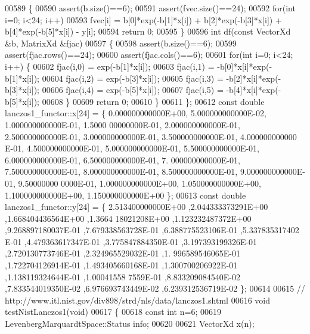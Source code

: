 \begin{DoxyCode}
00589     \{
00590         assert(b.size()==6);
00591         assert(fvec.size()==24);
00592         \textcolor{keywordflow}{for}(\textcolor{keywordtype}{int} i=0; i<24; i++)
00593             fvec[i] = b[0]*exp(-b[1]*x[i]) + b[2]*exp(-b[3]*x[i]) + b[4]*exp(-b[5]*x[i])  - y[i];
00594         \textcolor{keywordflow}{return} 0;
00595     \}
00596     \textcolor{keywordtype}{int} df(\textcolor{keyword}{const} VectorXd &b, MatrixXd &fjac)
00597     \{
00598         assert(b.size()==6);
00599         assert(fjac.rows()==24);
00600         assert(fjac.cols()==6);
00601         \textcolor{keywordflow}{for}(\textcolor{keywordtype}{int} i=0; i<24; i++) \{
00602             fjac(i,0) = exp(-b[1]*x[i]);
00603             fjac(i,1) = -b[0]*x[i]*exp(-b[1]*x[i]);
00604             fjac(i,2) = exp(-b[3]*x[i]);
00605             fjac(i,3) = -b[2]*x[i]*exp(-b[3]*x[i]);
00606             fjac(i,4) = exp(-b[5]*x[i]);
00607             fjac(i,5) = -b[4]*x[i]*exp(-b[5]*x[i]);
00608         \}
00609         \textcolor{keywordflow}{return} 0;
00610     \}
00611 \};
00612 \textcolor{keyword}{const} \textcolor{keywordtype}{double} lanczos1\_functor::x[24] = \{ 0.000000000000E+00, 5.000000000000E-02, 1.000000000000E-01, 1.5000
      00000000E-01, 2.000000000000E-01, 2.500000000000E-01, 3.000000000000E-01, 3.500000000000E-01, 4.000000000000
      E-01, 4.500000000000E-01, 5.000000000000E-01, 5.500000000000E-01, 6.000000000000E-01, 6.500000000000E-01, 7.
      000000000000E-01, 7.500000000000E-01, 8.000000000000E-01, 8.500000000000E-01, 9.000000000000E-01, 9.50000000
      0000E-01, 1.000000000000E+00, 1.050000000000E+00, 1.100000000000E+00, 1.150000000000E+00 \};
00613 \textcolor{keyword}{const} \textcolor{keywordtype}{double} lanczos1\_functor::y[24] = \{ 2.513400000000E+00 ,2.044333373291E+00 ,1.668404436564E+00 ,1.3664
      18021208E+00 ,1.123232487372E+00 ,9.268897180037E-01 ,7.679338563728E-01 ,6.388775523106E-01 ,5.337835317402
      E-01 ,4.479363617347E-01 ,3.775847884350E-01 ,3.197393199326E-01 ,2.720130773746E-01 ,2.324965529032E-01 ,1.
      996589546065E-01 ,1.722704126914E-01 ,1.493405660168E-01 ,1.300700206922E-01 ,1.138119324644E-01 ,1.00041558
      7559E-01 ,8.833209084540E-02 ,7.833544019350E-02 ,6.976693743449E-02 ,6.239312536719E-02 \};
00614 
00615 \textcolor{comment}{// http://www.itl.nist.gov/div898/strd/nls/data/lanczos1.shtml}
00616 \textcolor{keywordtype}{void} testNistLanczos1(\textcolor{keywordtype}{void})
00617 \{
00618   \textcolor{keyword}{const} \textcolor{keywordtype}{int} n=6;
00619   LevenbergMarquardtSpace::Status info;
00620 
00621   VectorXd x(n);

\end{DoxyCode}
